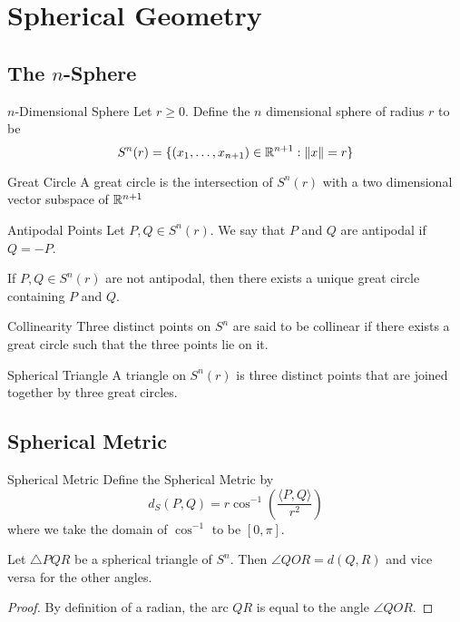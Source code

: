 \documentclass[a4paper]{article}
\begin{document}
\pagebreak
\section{Spherical Geometry}
\subsection{The $n$-Sphere}
\begin{defn}{$n$-Dimensional Sphere}{} Let $r\geq 0$. Define the $n$ dimensional sphere of radius $r$ to be $$S^n(r)=\{(x_1,\dots,x_{n+1})\in\mathbb{R}^{n+1}:\|x\|=r\}$$
\end{defn}

\begin{defn}{Great Circle}{} A great circle is the intersection of $S^n(r)$ with a two dimensional vector subspace of $\mathbb{R}^{n+1}$
\end{defn}

\begin{defn}{Antipodal Points}{} Let $P,Q\in S^n(r)$. We say that $P$ and $Q$ are antipodal if $Q=-P$. 
\end{defn}

\begin{lmm}{}{} If $P,Q\in S^n(r)$ are not antipodal, then there exists a unique great circle containing $P$ and $Q$. 
\end{lmm}

\begin{defn}{Collinearity}{} Three distinct points on $S^n$ are said to be collinear if there exists a great circle such that the three points lie on it. 
\end{defn}

\begin{defn}{Spherical Triangle}{} A triangle on $S^n(r)$ is three distinct points that are joined together by three great circles. 
\end{defn}

\subsection{Spherical Metric}
\begin{defn}{Spherical Metric}{} Define the Spherical Metric by $$d_S(P,Q)=r\cos^{-1}\left(\frac{\langle P,Q\rangle}{r^2}\right)$$ where we take the domain of $\cos^{-1}$ to be $[0,\pi]$. 
\end{defn}

\begin{prp}{}{} Let $\triangle PQR$ be a spherical triangle of $S^n$. Then $\angle QOR=d(Q,R)$ and vice versa for the other angles. \tcbline
\begin{proof} By definition of a radian, the arc $QR$ is equal to the angle $\angle QOR$. 
\end{proof}
\end{prp}
\end{document}
